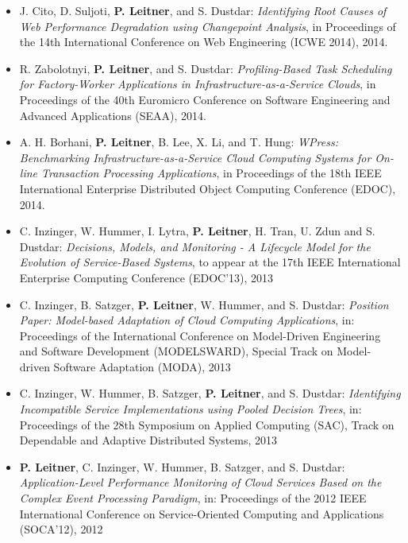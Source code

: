 \documentclass[paper=letter,fontsize=11pt]{scrartcl} %
\begin{document}
\begin{itemize}
  \item J. Cito, D. Suljoti, \textbf{P. Leitner}, and S. Dustdar: \emph{Identifying Root Causes of Web Performance Degradation using Changepoint Analysis}, in Proceedings of the 14th International Conference on Web Engineering (ICWE 2014), 2014.
 \item R. Zabolotnyi, \textbf{P. Leitner}, and S. Dustdar: \emph{Profiling-Based Task Scheduling for Factory-Worker Applications in Infrastructure-as-a-Service Clouds}, in Proceedings of the 40th Euromicro Conference on Software Engineering and Advanced Applications (SEAA), 2014.
 \item A. H. Borhani, \textbf{P. Leitner}, B. Lee, X. Li, and T. Hung: \emph{WPress: Benchmarking Infrastructure-as-a-Service Cloud Computing Systems for On-line Transaction Processing Applications}, in Proceedings of the 18th IEEE International Enterprise Distributed Object Computing Conference (EDOC), 2014.
\item C. Inzinger, W. Hummer, I. Lytra, \textbf{P. Leitner}, H. Tran, U. Zdun and S. Dustdar: \emph{Decisions, Models, and Monitoring - A Lifecycle Model for the Evolution of Service-Based Systems}, to appear at the 17th IEEE International Enterprise Computing Conference (EDOC'13), 2013
\item C. Inzinger, B. Satzger, \textbf{P. Leitner}, W. Hummer, and S. Dustdar:
\emph{Position Paper: Model-based Adaptation of Cloud Computing Applications},  in: Proceedings of the International Conference on Model-Driven Engineering and Software Development (MODELSWARD), Special Track on Model-driven Software Adaptation (MODA), 2013
\item C. Inzinger, W. Hummer, B. Satzger, \textbf{P. Leitner}, and S. Dustdar:
\emph{Identifying Incompatible Service Implementations using Pooled Decision Trees},  in: Proceedings of the 28th Symposium on Applied Computing (SAC), Track on Dependable and Adaptive Distributed Systems, 2013
\item \textbf{P. Leitner}, C. Inzinger, W. Hummer, B. Satzger, and S. Dustdar:
\emph{Application-Level Performance Monitoring of Cloud Services Based on the Complex Event Processing Paradigm}, in: Proceedings of the 2012 IEEE International Conference on Service-Oriented Computing and Applications (SOCA'12), 2012
\end{itemize}
\end{document}

